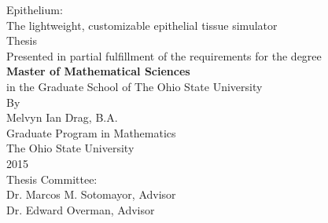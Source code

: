 \begin{titlepage}
\begin{center}
Epithelium:\\
The lightweight, customizable epithelial tissue simulator \\[2cm]
Thesis\\[2cm]
Presented in partial fulfillment of the requirements for the degree\\
{\bf{Master of Mathematical Sciences}}\\ in the Graduate School of The Ohio State University \\[1cm]
By\\
Melvyn Ian Drag, B.A.\\
Graduate Program in Mathematics\\[1cm]
The Ohio State University\\
2015\\[2cm]
Thesis Committee:\\
Dr. Marcos M. Sotomayor, Advisor\\
Dr. Edward Overman, Advisor
\end{center}
\end{titlepage}
